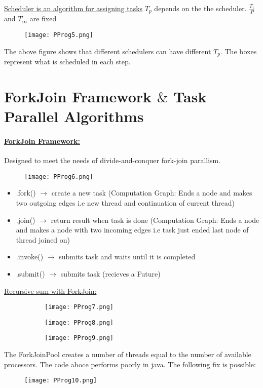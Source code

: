\documentclass[8pt]{extreport}
\begin{document}
\underline{Scheduler is an algorithm for assigning tasks} $T_p$ depends on the the scheduler. $\frac{T_1}{P}$ and $T_\infty$ are fixed
\begin{figure}[h!]
	\centering\texttt{[image: PProg5.png]}
	\caption{}
	\label{PProg5}
\end{figure}
The above figure shows that different schedulers can have different $T_p$. The boxes represent what is scheduled in each step.
\section{ForkJoin Framework $\&$ Task Parallel Algorithms}

\paragraph{\underline{ForkJoin Framework:}} Designed to meet the needs of divide-and-conquer fork-join parallism.

\begin{figure}[h!]
	\centering\texttt{[image: PProg6.png]}
	\caption{}
	\label{PProg6}
\end{figure}
\begin{itemize}
\item .fork() $\rightarrow$ create a new task (Computation Graph: Ends a node and makes two outgoing edges i.e new thread and continuation of current thread)
\item .join() $\rightarrow$ return result when task is done (Computation Graph: Ends a node and makes a node with two incoming edges i.e task just ended last node of thread joined on)
\item .invoke() $\rightarrow$ submits task and waits until it is completed
\item .submit() $\rightarrow$ submits task (recieves a Future)
\end{itemize} 
\newpage
\underline{Recursive sum with ForkJoin:}
\begin{figure}[h!]
	\centering
	\begin{subfigure}[b]{0.49\linewidth}
	\texttt{[image: PProg7.png]}
	\caption{}
	\label{PProg7}
	\end{subfigure}
	\begin{subfigure}[b]{0.49\linewidth}
	\texttt{[image: PProg8.png]}
	\caption{}
	\label{PProg8}
	\end{subfigure}
	\begin{subfigure}[b]{0.49\linewidth}
	\texttt{[image: PProg9.png]}
	\caption{}
	\label{PProg9}
	\end{subfigure}
\end{figure}
The ForkJoinPool creates a number of threads equal to the number of available processors. The code aboce performs poorly in java. The following fix is possible:
\begin{figure}[h!]
	\centering\texttt{[image: PProg10.png]}
	\caption{}
	\label{PProg10}
\end{figure}
\end{document}
